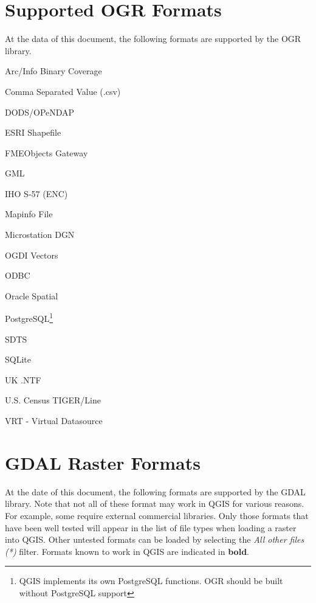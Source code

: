 \documentclass[10pt,english]{article}
\begin{document}
\begin{onehalfspace}
\section{Supported OGR Formats}\label{appdx_ogr} 
At the data of this document, the following formats are supported by the OGR library.
\begin{compactitem}
\item Arc/Info Binary Coverage
\item Comma Separated Value (.csv) 
\item DODS/OPeNDAP
\item ESRI Shapefile
\item FMEObjects Gateway
\item GML
\item IHO S-57 (ENC)
\item Mapinfo File
\item Microstation DGN
\item OGDI Vectors
\item ODBC
\item Oracle Spatial
\item PostgreSQL\footnote{QGIS implements its own PostgreSQL functions. OGR should be built without PostgreSQL support}
\item SDTS
\item SQLite
\item UK .NTF
\item U.S. Census TIGER/Line
\item VRT - Virtual Datasource
\end{compactitem}
\section{GDAL Raster Formats}\label{appdx_gdal}
At the date of this document, the following formats are supported by the GDAL library. Note that not all of these format may work in QGIS for various reasons. For example, some require external commercial libraries. Only those formats that have been well tested will appear in the list of file types when loading a raster into QGIS. Other untested formats can be loaded by selecting the \textsl{All other files (*)} filter. Formats known to work in QGIS are indicated in \textbf{bold}.


\end{onehalfspace}
\end{document}
